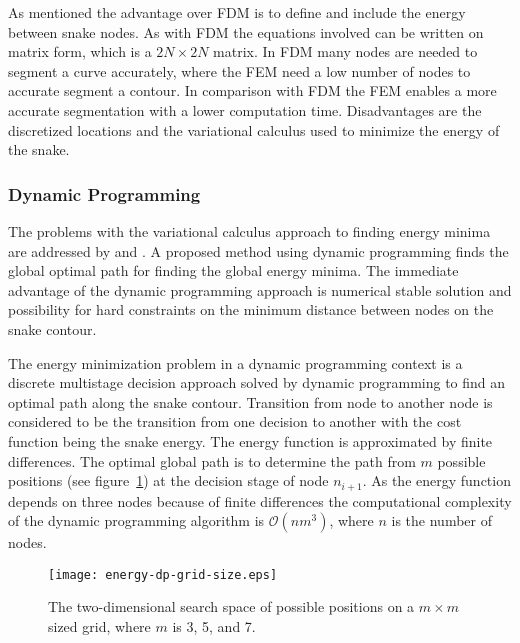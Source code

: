 As mentioned the advantage over FDM is to define and include the
energy between snake nodes. As with FDM the equations involved can be
written on matrix form, which is a $2N \times 2N$ matrix. In FDM many
nodes are needed to segment a curve accurately, where the FEM need
a low number of nodes to accurate segment a contour. In comparison
with FDM the FEM enables a more accurate segmentation with a lower
computation time. Disadvantages are the discretized locations and the
variational calculus used to minimize the energy of the snake.

\subsubsection{Dynamic Programming}
\label{sec:dynamic-programming}

The problems with the variational calculus approach to finding energy
minima are addressed by \citet{amini88} and \citet{amini90}. A
proposed method using dynamic programming finds the global optimal
path for finding the global energy minima. The immediate advantage of
the dynamic programming approach is numerical stable solution and
possibility for hard constraints on the minimum distance between nodes
on the snake contour.

The energy minimization problem in a dynamic programming context is a
discrete multistage decision approach solved by dynamic programming to
find an optimal path along the snake contour. Transition from node to
another node is considered to be the transition from one decision to
another with the cost function being the snake energy. The energy
function is approximated by finite differences. The optimal global
path is to determine the path from $m$ possible positions (see
figure~\ref{fig:energy-dp-grid-size}) at the decision stage of node
$n_{i+1}$. As the energy function depends on three nodes because of
finite differences the computational complexity of the dynamic
programming algorithm is $\mathcal{O}(nm^3)$, where $n$ is the number
of nodes.
\begin{figure}[htbp]
  \centering
  \texttt{[image: energy-dp-grid-size.eps]}
  \caption{The two-dimensional search space of possible positions on a 
    $m \times m$ sized grid, where $m$ is 3, 5, and 7.}
  \label{fig:energy-dp-grid-size}
\end{figure}

